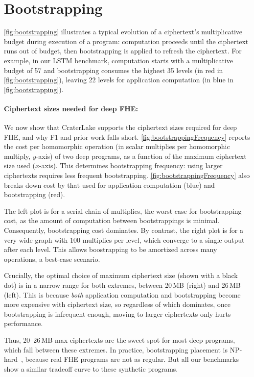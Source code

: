 \section{Bootstrapping}

\figBootstrapping

\autoref{fig:bootstrapping} illustrates a typical evolution of a ciphertext's
multiplicative budget during execution of a program: computation proceeds until
the ciphertext runs out of budget, then bootstrapping is applied to refresh the
ciphertext. For example, in our LSTM benchmark, computation starts with a
multiplicative budget of 57 and bootstrapping consumes the highest 35 levels
(in red in \autoref{fig:bootstrapping}), leaving 22 levels for application
computation (in blue in \autoref{fig:bootstrapping}).

\paragraph{Ciphertext sizes needed for deep FHE:}
We now show that CraterLake supports the ciphertext sizes required for deep FHE, and
why F1 and prior work falls short. \autoref{fig:bootstrappingFrequency} reports the
cost per homomorphic operation (in scalar multiplies per homomorphic multiply,
$y$-axis) of two deep programs, as a function of the maximum ciphertext size
used ($x$-axis). This determines bootstrapping frequency: using larger
ciphertexts requires less frequent bootstrapping.
\autoref{fig:bootstrappingFrequency} also breaks down cost by that used for
application computation (blue) and bootstrapping (red).

The left plot is for a serial chain of multiplies, the worst case for
bootstrapping cost, as the amount of computation between bootstrappings is
minimal. Consequently, bootstrapping cost dominates. By contrast, the right
plot is for a very wide graph with 100 multiplies per level, which converge to
a single output after each level. This allows boostrapping to be amortized
across many operations, a best-case scenario.

Crucially, the optimal choice of maximum ciphertext size (shown with a black
dot) is in a narrow range for both extremes, between 20\,MB (right) and 26\,MB
(left). This is because \emph{both} application computation and bootstrapping
become more expensive with ciphertext size, so regardless of which dominates,
once bootstrapping is infrequent enough, moving to larger ciphertexts only
hurts performance.

Thus, 20--26\,MB max ciphertexts are the sweet spot for most deep programs,
which fall between these extremes. In practice, bootstrapping placement is
NP-hard~\cite{benhamouda2017optimization}, because real FHE programs are not as
regular. But all our benchmarks show a similar tradeoff curve to these
synthetic programs.

